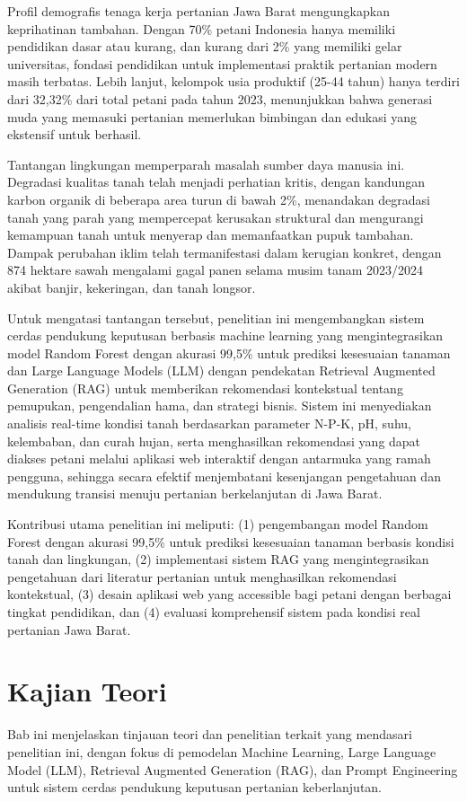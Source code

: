 \documentclass{article} %
\begin{document}
Profil demografis tenaga kerja pertanian Jawa Barat mengungkapkan keprihatinan tambahan. Dengan 70\% petani Indonesia hanya memiliki pendidikan dasar atau kurang, dan kurang dari 2\% yang memiliki gelar universitas, fondasi pendidikan untuk implementasi praktik pertanian modern masih terbatas. Lebih lanjut, kelompok usia produktif (25-44 tahun) hanya terdiri dari 32,32\% dari total petani pada tahun 2023, menunjukkan bahwa generasi muda yang memasuki pertanian memerlukan bimbingan dan edukasi yang ekstensif untuk berhasil.

Tantangan lingkungan memperparah masalah sumber daya manusia ini. Degradasi kualitas tanah telah menjadi perhatian kritis, dengan kandungan karbon organik di beberapa area turun di bawah 2\%, menandakan degradasi tanah yang parah yang mempercepat kerusakan struktural dan mengurangi kemampuan tanah untuk menyerap dan memanfaatkan pupuk tambahan. Dampak perubahan iklim telah termanifestasi dalam kerugian konkret, dengan 874 hektare sawah mengalami gagal panen selama musim tanam 2023/2024 akibat banjir, kekeringan, dan tanah longsor.

Untuk mengatasi tantangan tersebut, penelitian ini mengembangkan sistem cerdas pendukung keputusan berbasis machine learning yang mengintegrasikan model Random Forest dengan akurasi 99,5\% untuk prediksi kesesuaian tanaman dan Large Language Models (LLM) dengan pendekatan Retrieval Augmented Generation (RAG) untuk memberikan rekomendasi kontekstual tentang pemupukan, pengendalian hama, dan strategi bisnis. Sistem ini menyediakan analisis real-time kondisi tanah berdasarkan parameter N-P-K, pH, suhu, kelembaban, dan curah hujan, serta menghasilkan rekomendasi yang dapat diakses petani melalui aplikasi web interaktif dengan antarmuka yang ramah pengguna, sehingga secara efektif menjembatani kesenjangan pengetahuan dan mendukung transisi menuju pertanian berkelanjutan di Jawa Barat.

Kontribusi utama penelitian ini meliputi: (1) pengembangan model Random Forest dengan akurasi 99,5\% untuk prediksi kesesuaian tanaman berbasis kondisi tanah dan lingkungan, (2) implementasi sistem RAG yang mengintegrasikan pengetahuan dari literatur pertanian untuk menghasilkan rekomendasi kontekstual, (3) desain aplikasi web yang accessible bagi petani dengan berbagai tingkat pendidikan, dan (4) evaluasi komprehensif sistem pada kondisi real pertanian Jawa Barat.

\section{Kajian Teori}
Bab ini menjelaskan tinjauan teori dan penelitian terkait yang mendasari penelitian ini, dengan fokus di pemodelan Machine Learning, Large Language Model (LLM), Retrieval Augmented Generation (RAG), dan Prompt Engineering untuk sistem cerdas pendukung keputusan pertanian keberlanjutan.
\end{document}
